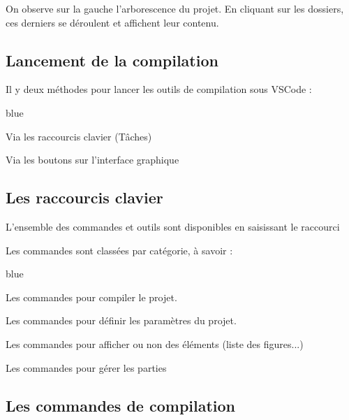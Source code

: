{On observe sur la gauche l'arborescence du projet. En cliquant sur les dossiers, ces derniers se déroulent et affichent leur contenu.


    
\subsection{Lancement de la compilation}

Il y deux méthodes pour lancer les outils de compilation sous VSCode :

\begin{items}{blue}{\Bullet}
    \item Via les raccourcis clavier (Tâches)
    \item Via les boutons sur l'interface graphique
\end{items}

\subsection{Les raccourcis clavier}

\label{allTasks}
L'ensemble des commandes et outils sont disponibles en saisissant le raccourci  


Les commandes sont classées par catégorie, à savoir : 

\begin{items}{blue}{\Triangle}

    \item {}

    Les commandes pour compiler le projet. 
    \item {}

    Les commandes pour définir les paramètres du projet.
    \item {}

    Les commandes pour afficher ou non des éléments (liste des figures...)
    \item {}

    Les commandes pour gérer les parties
\end{items}

\subsection{Les commandes de compilation}

}
